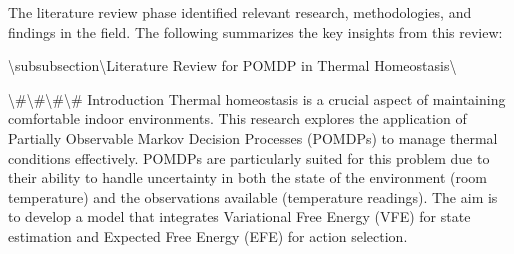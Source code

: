 \documentclass[11pt,a4paper]{article}
\begin{document}
The literature review phase identified relevant research, methodologies, and findings in the field. The following summarizes the key insights from this review:

\textbackslash{}subsubsection\textbackslash{}{Literature Review for POMDP in Thermal Homeostasis\textbackslash{}}

\textbackslash{}#\textbackslash{}#\textbackslash{}#\textbackslash{}# Introduction
Thermal homeostasis is a crucial aspect of maintaining comfortable indoor environments. This research explores the application of Partially Observable Markov Decision Processes (POMDPs) to manage thermal conditions effectively. POMDPs are particularly suited for this problem due to their ability to handle uncertainty in both the state of the environment (room temperature) and the observations available (temperature readings). The aim is to develop a model that integrates Variational Free Energy (VFE) for state estimation and Expected Free Energy (EFE) for action selection.
\end{document}
